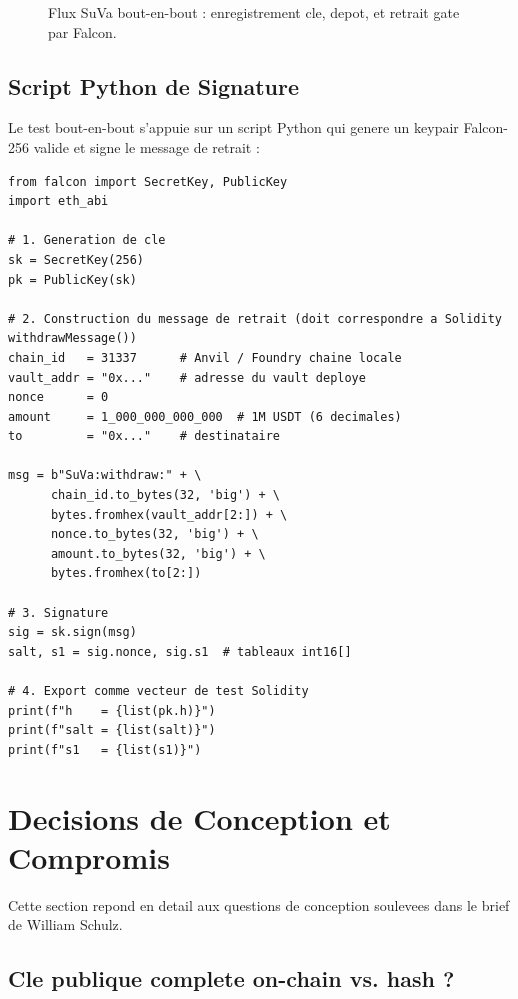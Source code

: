 \documentclass[11pt,a4paper]{article}
\begin{document}
\begin{figure}[H]
\begin{tikzpicture}
\end{tikzpicture}
\caption{Flux SuVa bout-en-bout : enregistrement cle, depot, et retrait gate par Falcon.}
\end{figure}

\subsection{Script Python de Signature}

Le test bout-en-bout s'appuie sur un script Python qui genere un keypair Falcon-256 valide
et signe le message de retrait :

\begin{lstlisting}[style=python, caption={Signature du message de retrait (Python)}]
from falcon import SecretKey, PublicKey
import eth_abi

# 1. Generation de cle
sk = SecretKey(256)
pk = PublicKey(sk)

# 2. Construction du message de retrait (doit correspondre a Solidity withdrawMessage())
chain_id   = 31337      # Anvil / Foundry chaine locale
vault_addr = "0x..."    # adresse du vault deploye
nonce      = 0
amount     = 1_000_000_000_000  # 1M USDT (6 decimales)
to         = "0x..."    # destinataire

msg = b"SuVa:withdraw:" + \
      chain_id.to_bytes(32, 'big') + \
      bytes.fromhex(vault_addr[2:]) + \
      nonce.to_bytes(32, 'big') + \
      amount.to_bytes(32, 'big') + \
      bytes.fromhex(to[2:])

# 3. Signature
sig = sk.sign(msg)
salt, s1 = sig.nonce, sig.s1  # tableaux int16[]

# 4. Export comme vecteur de test Solidity
print(f"h    = {list(pk.h)}")
print(f"salt = {list(salt)}")
print(f"s1   = {list(s1)}")
\end{lstlisting}

\newpage
\section{Decisions de Conception et Compromis}

Cette section repond en detail aux questions de conception soulevees dans le brief de William Schulz.

\subsection{Cle publique complete on-chain vs. hash ?}
\end{document}
